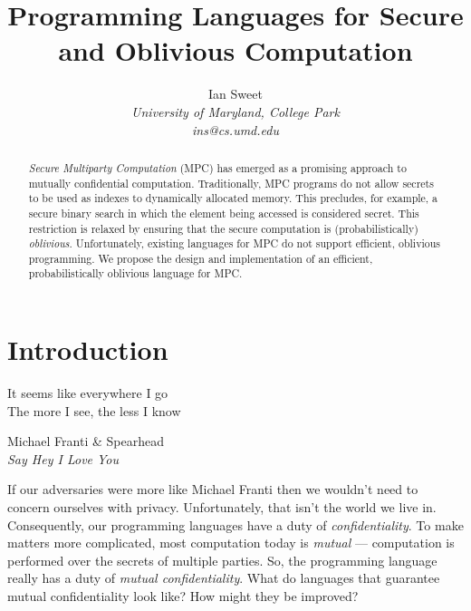 \documentclass{report}
\begin{document}
\title{Programming Languages for Secure and Oblivious Computation}

\author{Ian Sweet \\
  \emph{University of Maryland, College Park} \\
  \emph{ins@cs.umd.edu}}

\date{}

\maketitle

\begin{abstract}

  \emph{Secure Multiparty Computation} (MPC) has emerged as a promising approach to mutually confidential computation.
  Traditionally, MPC programs do not allow secrets to be used as indexes to dynamically allocated memory.
  This precludes, for example, a secure binary search in which the element being accessed is considered secret.
  This restriction is relaxed by ensuring that the secure computation is (probabilistically) \emph{oblivious}.
  Unfortunately, existing languages for MPC do not support efficient, oblivious programming. We propose the design
  and implementation of an efficient, probabilistically oblivious language for MPC.
\end{abstract}

\tableofcontents

\chapter{Introduction}
\label{ch:intro}

\epigraph{It seems like everywhere I go \\
          The more I see, the less I know}{
            Michael Franti \& Spearhead \\
            \emph{Say Hey I Love You}}

If our adversaries were more like Michael Franti then we wouldn't need to concern ourselves with privacy.
Unfortunately, that isn't the world we live in. Consequently, our programming languages have a duty of
\emph{confidentiality}. To make matters more complicated, most computation today is \emph{mutual} --- computation is
performed over the secrets of multiple parties. So, the programming language really has a duty of
\emph{mutual confidentiality}. What do languages that guarantee mutual confidentiality look like? How
might they be improved?
\end{document}
